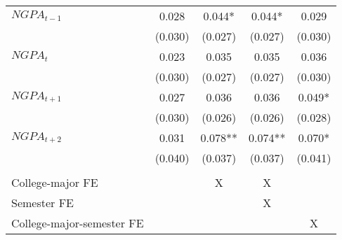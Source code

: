 {{\begin{tabular}{lccc|>{\columncolor[gray]{0.8}}c}
\hspace{3mm}$NGPA_{t-1}$            &       0.028   &       0.044*  &       0.044*  &       0.029   \\
                    &     (0.030)   &     (0.027)   &     (0.027)   &     (0.030)   \\
 
\hspace{3mm}$NGPA_{t}$              &       0.023   &       0.035   &       0.035   &       0.036   \\
                    &     (0.030)   &     (0.027)   &     (0.027)   &     (0.030)   \\
 
\hspace{3mm}$NGPA_{t+1}$            &       0.027   &       0.036   &       0.036   &       0.049*  \\
                    &     (0.030)   &     (0.026)   &     (0.026)   &     (0.028)   \\
 
\hspace{3mm}$NGPA_{t+2}$           &       0.031   &       0.078** &       0.074** &       0.070*  \\
                    &     (0.040)   &     (0.037)   &     (0.037)   &     (0.041)   \\
&  &  &  &   \\  \hline 
 College-major FE                       &  & X   & X &   \\
 Semester FE                            &  &     & X &   \\
 College-major-semester FE              &  &     &   & X \\

\bottomrule
\end{tabular}
}
}
